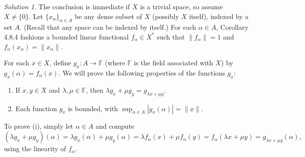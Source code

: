\documentclass{report}
\newcommand{\bb}[1]{\mathbb{#1}}
\newcommand{\norm}[1]{{\lVert #1 \rVert}}
\theoremstyle{remark}
\newtheorem*{solution}{Solution}
\begin{document}
\begin{solution}
  The conclusion is immediate if $X$ is a trivial space, so assume $X \ne \{0\}$. Let $\{x_\alpha\}_{\alpha \in A}$ be any dense subset of $X$ (possibly $X$ itself), indexed by a set $A$. (Recall that any space can be indexed by itself.) For each $\alpha \in A$, Corollary 4.8.4 fashions a bounded linear functional $f_\alpha \in X^*$ such that $\norm{f_\alpha} = 1$ and $f_\alpha(x_\alpha) = \norm{x_\alpha}$.

  For each $x \in X$, define $g_x: A \to \bb F$ (where $\bb F$ is the field associated with $X$) by $g_x(\alpha) = f_\alpha(x)$. We will prove the following properties of the functions $g_x$:
  \begin{enumerate}[label=(\roman*)]
    \item If $x, y \in X$ and $\lambda, \mu \in \bb F$, then $\lambda g_x + \mu g_y = g_{\lambda x + \mu y}$.
    \item Each function $g_x$ is bounded, with $\sup_{\alpha \in A} |g_x(\alpha)| = \norm x$.
  \end{enumerate}

  To prove (i), simply let $\alpha \in A$ and compute
  \begin{equation*}
    (\lambda g_x + \mu g_y)(\alpha) = \lambda g_x(\alpha) + \mu g_y(\alpha) = \lambda f_\alpha(x) + \mu f_\alpha(y) = f_\alpha(\lambda x + \mu y) = g_{\lambda x + \mu y}(\alpha),
  \end{equation*}
  using the linearity of $f_\alpha$.


\end{solution}
\end{document}

